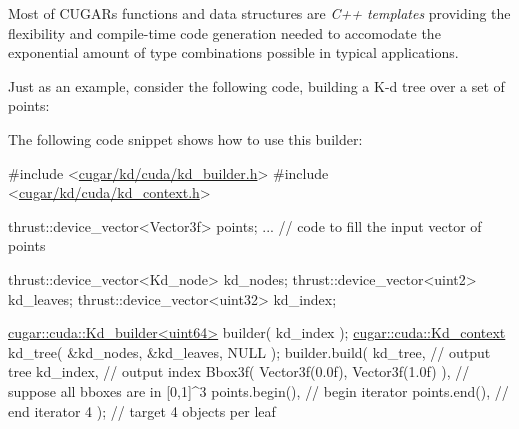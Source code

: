 \begin{DoxyParagraph}{}
Most of C\+U\+G\+AR\textquotesingle{}s functions and data structures are {\itshape C++ templates} providing the flexibility and compile-\/time code generation needed to accomodate the exponential amount of type combinations possible in typical applications. 
\end{DoxyParagraph}
\begin{DoxyParagraph}{}
Just as an example, consider the following code, building a K-\/d tree over a set of points\+: 
\end{DoxyParagraph}
\begin{DoxyParagraph}{}
The following code snippet shows how to use this builder\+: 
\begin{DoxyCode}
\textcolor{preprocessor}{#include <\hyperlink{kd__builder_8h}{cugar/kd/cuda/kd\_builder.h}>}
\textcolor{preprocessor}{#include <\hyperlink{kd__context_8h}{cugar/kd/cuda/kd\_context.h}>}

thrust::device\_vector<Vector3f> points;
... \textcolor{comment}{// code to fill the input vector of points}

thrust::device\_vector<Kd\_node>  kd\_nodes;
thrust::device\_vector<uint2>    kd\_leaves;
thrust::device\_vector<uint32>   kd\_index;

\hyperlink{structcugar_1_1cuda_1_1_kd__builder}{cugar::cuda::Kd\_builder<uint64>} builder( kd\_index );
\hyperlink{structcugar_1_1cuda_1_1_kd__context}{cugar::cuda::Kd\_context} kd\_tree( &kd\_nodes, &kd\_leaves, NULL );
builder.build(
    kd\_tree,                                    \textcolor{comment}{// output tree}
    kd\_index,                                   \textcolor{comment}{// output index}
    Bbox3f( Vector3f(0.0f), Vector3f(1.0f) ),   \textcolor{comment}{// suppose all bboxes are in [0,1]^3}
    points.begin(),                             \textcolor{comment}{// begin iterator}
    points.end(),                               \textcolor{comment}{// end iterator}
    4 );                                        \textcolor{comment}{// target 4 objects per leaf}
\end{DoxyCode}

\end{DoxyParagraph}
